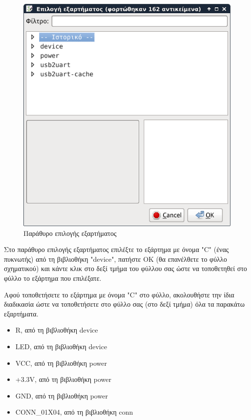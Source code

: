 \documentclass[a4paper]{article}
\begin{document}
\begin{figure}
  \begin{center}
    \includegraphics[width=.9\textwidth]{img/eesch-dial-addcomp.png}
    \caption{Παράθυρο επιλογής εξαρτήματος}
    \label{fig:eesch-dial-addcomp}
  \end{center}
\end{figure}

Στο παράθυρο επιλογής εξαρτήματος επιλέξτε το εξάρτημα με όνομα "C" (ένας πυκνωτής) από τη βιβλιοθήκη "device", πατήστε ΟΚ (θα επανέλθετε το φύλλο σχηματικού) και κάντε κλικ στο δεξί τμήμα του φύλλου σας ώστε να τοποθετηθεί στο φύλλο το εξάρτημα που επιλέξατε. 

Αφού τοποθετήσετε το εξάρτημα με όνομα "C" στο φύλλο, ακολουθήστε την ίδια διαδικασία ώστε να τοποθετήσετε στο φύλλο σας (στο δεξί τμήμα) όλα τα παρακάτω εξαρτήματα. 

\begin{itemize}
    \item R, από τη βιβλιοθήκη device
    \item \textenglish{LED}, από τη βιβλιοθήκη device
    \item VCC, από τη βιβλιοθήκη power
    \item +3.3V, από τη βιβλιοθήκη power
    \item GND, από τη βιβλιοθήκη power
    \item CONN\_01X04, από τη βιβλιοθήκη conn
\end{itemize}
\end{document}

